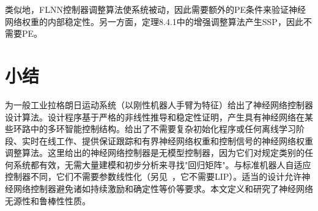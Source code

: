 \documentclass[12pt,a4paper]{ctexart}
\begin{document}
类似地，FLNN控制器调整算法使系统被动，因此需要额外的PE条件来验证神经网络权重的内部稳定性。另一方面，定理8.4.1中的增强调整算法产生SSP，因此不需要PE。

\section{小结}

为一般工业拉格朗日运动系统（以刚性机器人手臂为特征）给出了神经网络控制器设计算法。设计程序基于严格的非线性推导和稳定性证明，产生具有神经网络在某些环路中的多环智能控制结构。给出了不需要复杂初始化程序或任何离线学习阶段、实时在线工作、提供保证跟踪和有界神经网络权重和控制信号的神经网络权重调整算法。这里给出的神经网络控制器是无模型控制器，因为它们对规定类别的任何系统都有效，无需大量建模和初步分析来寻找"回归矩阵"。与标准机器人自适应控制器不同，它们不需要参数线性化（另见~\cite{colbaugh1994}，它不需要LIP）。适当的设计允许神经网络控制器避免诸如持续激励和确定性等价等要求。本文定义和研究了神经网络无源性和鲁棒性性质。
\end{document}

